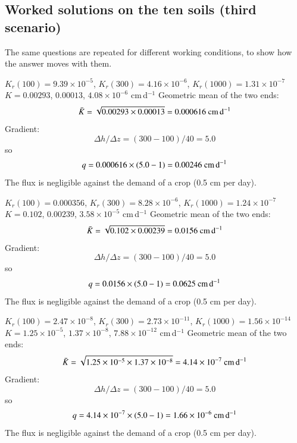 \subsection{Worked solutions on the ten soils (third scenario)}
The same questions are repeated for different working conditions, to show how the answer moves with them.

\sol {}\ans $K_r(100)=9.39\times10^{-5}$, $K_r(300)=4.16\times10^{-6}$, $K_r(1000)=1.31\times10^{-7}$ \ans $K=0.00293$, $0.00013$, $4.08\times10^{-6}$ cm\,d$^{-1}$ \ans Geometric mean of the two ends: \[\bar K=\sqrt{0.00293\times0.00013}=0.000616\ \text{cm\,d$^{-1}$}\] \ans Gradient: \[\Delta h/\Delta z=(300-100)/40=5.0\]
so \[q=0.000616\times(5.0-1)=0.00246\ \text{cm\,d$^{-1}$}\] \ans The flux is negligible against the demand of a crop (0.5 cm per day). \finans

\sol {}\ans $K_r(100)=0.000356$, $K_r(300)=8.28\times10^{-6}$, $K_r(1000)=1.24\times10^{-7}$ \ans $K=0.102$, $0.00239$, $3.58\times10^{-5}$ cm\,d$^{-1}$ \ans Geometric mean of the two ends: \[\bar K=\sqrt{0.102\times0.00239}=0.0156\ \text{cm\,d$^{-1}$}\] \ans Gradient: \[\Delta h/\Delta z=(300-100)/40=5.0\]
so \[q=0.0156\times(5.0-1)=0.0625\ \text{cm\,d$^{-1}$}\] \ans The flux is negligible against the demand of a crop (0.5 cm per day). \finans

\sol {}\ans $K_r(100)=2.47\times10^{-8}$, $K_r(300)=2.73\times10^{-11}$, $K_r(1000)=1.56\times10^{-14}$ \ans $K=1.25\times10^{-5}$, $1.37\times10^{-8}$, $7.88\times10^{-12}$ cm\,d$^{-1}$ \ans Geometric mean of the two ends: \[\bar K=\sqrt{1.25\times10^{-5}\times1.37\times10^{-8}}=4.14\times10^{-7}\ \text{cm\,d$^{-1}$}\] \ans Gradient: \[\Delta h/\Delta z=(300-100)/40=5.0\]
so \[q=4.14\times10^{-7}\times(5.0-1)=1.66\times10^{-6}\ \text{cm\,d$^{-1}$}\] \ans The flux is negligible against the demand of a crop (0.5 cm per day). \finans

